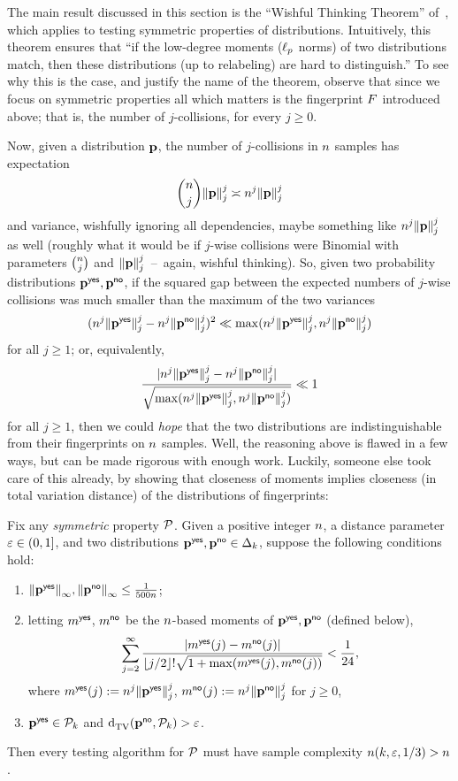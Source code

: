 The main result discussed in this section is the ``Wishful Thinking Theorem'' of~\citet{Valiant:11}, which applies to testing symmetric properties of distributions. Intuitively, this theorem ensures that ``if the low-degree moments ($\lp[p]$ norms) of two distributions match, then these distributions (up to relabeling) are hard to distinguish.'' To see why this is the case, and justify the name of the theorem, observe that since we focus on symmetric properties all which matters is the fingerprint $\freq$ introduced above; that is, the number of $j$-collisions, for every $j\geq 0$.

Now, given a distribution $\p$, the number of $j$-collisions in $\ns$ samples has expectation 
\[
	\binom{\ns}{j}\norm{\p}_j^j \asymp \ns^j\norm{\p}_j^j
\]
and variance, wishfully ignoring all dependencies, maybe something like $\ns^j\norm{\p}_j^j$ as well (roughly what it would be if $j$-wise collisions were Binomial with parameters $\binom{\ns}{j}$ and $\norm{\p}_j^j$~--~again, wishful thinking). So, given two probability distributions $\p^\yes,\p^\no$, if the squared gap between the expected numbers of $j$-wise collisions was much smaller than the maximum of the two variances
\[
		(\ns^j\norm{\p^\yes}_j^j - \ns^j\norm{\p^\no}_j^j )^2 \ll
		\max(\ns^j\norm{\p^\yes}_j^j, \ns^j\norm{\p^\no}_j^j)
\]
for all $j\geq 1$; or, equivalently, 
\[
	\frac{|\ns^j\norm{\p^\yes}_j^j - \ns^j\norm{\p^\no}_j^j|}{\sqrt{\max(\ns^j\norm{\p^\yes}_j^j, \ns^j\norm{\p^\no}_j^j)}} \ll 1
\] 
for all $j\geq 1$, then we could \emph{hope} that the two distributions are indistinguishable from their fingerprints on $\ns$ samples. Well, the reasoning above is flawed in a few ways, but can be made rigorous with enough work. Luckily, someone else took care of this already, by showing that closeness of moments implies closeness (in total variation distance) of the distributions of fingerprints:
\begin{theorem}
	\label{theo:valiant:wishful}
  Fix any \emph{symmetric} property $\property$. Given a positive integer $\ns$, a distance parameter $\dst\in(0,1]$, and two distributions $\p^\yes,\p^\no\in\distribs{\ab}$, suppose the following conditions hold:
  \begin{enumerate}
    \item $\norminf{\p^\yes},\norminf{\p^\no} \leq \frac{1}{500\ns}$;
    \item letting $m^\yes$, $m^\no$ be the $\ns$-based moments of $\p^\yes,\p^\no$ (defined below),
      \[
         \sum_{j=2}^\infty \frac{\abs{m^{\yes}(j)-m^{\no}(j)}}{\flr{j/2}!\sqrt{1+\max(m^{\yes}(j),m^{\no}(j))}} < \frac{1}{24},
      \]
      where $m^{\yes}(j) \eqdef \ns^j\norm{\p^\yes}_j^j$, $m^{\no}(j) \eqdef \ns^j\norm{\p^\no}_j^j$ for $j\geq 0$,
     \item $\p^\yes\in\property_\ab$ and $\totalvardist{\p^\no}{\property_\ab}>\dst$.
  \end{enumerate}
  Then every testing algorithm for $\property$ must have sample complexity $\ns(\ab,\dst, 1/3) > \ns$.
\end{theorem}
